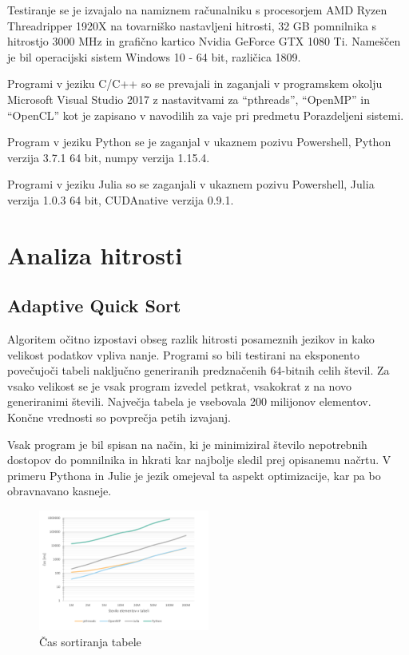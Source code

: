 \documentclass[journal,a4paper,twoside]{sty/IEEEtran}
\begin{document}
Testiranje se je izvajalo na namiznem računalniku s procesorjem AMD Ryzen Threadripper 1920X na tovarniško nastavljeni hitrosti, 32 GB pomnilnika s hitrostjo
	3000 MHz in grafično kartico Nvidia GeForce GTX 1080 Ti.
Nameščen je bil operacijski sistem Windows 10 - 64 bit, različica 1809.

Programi v jeziku C/C++ so se prevajali in zaganjali v programskem okolju Microsoft Visual Studio 2017 z nastavitvami za “pthreads”, “OpenMP” in “OpenCL”
	kot je zapisano v navodilih za vaje pri predmetu Porazdeljeni sistemi.

Program v jeziku Python se je zaganjal v ukaznem pozivu Powershell, Python verzija 3.7.1 64 bit, numpy verzija 1.15.4.

Programi v jeziku Julia so se zaganjali v ukaznem pozivu Powershell, Julia verzija 1.0.3 64 bit, CUDAnative verzija 0.9.1.

\section{Analiza hitrosti}

\subsection{Adaptive Quick Sort}

Algoritem očitno izpostavi obseg razlik hitrosti posameznih jezikov in kako velikost podatkov vpliva nanje.
Programi so bili testirani na eksponento povečujoči tabeli naključno generiranih predznačenih 64-bitnih celih števil.
Za vsako velikost se je vsak program izvedel petkrat, vsakokrat z na novo generiranimi števili.
Največja tabela je vsebovala 200 milijonov elementov.
Končne vrednosti so povprečja petih izvajanj.

Vsak program je bil spisan na način, ki je minimiziral število nepotrebnih dostopov do pomnilnika in hkrati kar najbolje sledil prej opisanemu načrtu.
V primeru Pythona in Julie je jezik omejeval ta aspekt optimizacije, kar pa bo obravnavano kasneje.

\begin{figure}[h]
\includegraphics[width=0.5\textwidth]{aqs_speed}
\caption{Čas sortiranja tabele}
\end{figure}
\end{document}
